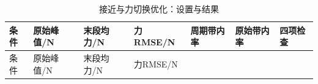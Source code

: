 \FloatBarrier\begingroup\small\setlength{\tabcolsep}{2.5pt}
\begin{longtable}[]{@{}
  >{\raggedright\arraybackslash}p{}
  >{\raggedright\arraybackslash}p{}
  >{\raggedright\arraybackslash}p{}
  >{\raggedright\arraybackslash}p{}
  >{\raggedright\arraybackslash}p{}
  >{\raggedright\arraybackslash}p{}
  >{\raggedright\arraybackslash}p{}@{}}
\caption{接近与力切换优化：设置与结果}\label{tab:s14-1}\tabularnewline
\toprule\noalign{}
\begin{minipage}[b]{\linewidth}\raggedright
条件
\end{minipage} & \begin{minipage}[b]{\linewidth}\raggedright
原始峰值/N
\end{minipage} & \begin{minipage}[b]{\linewidth}\raggedright
末段均力/N
\end{minipage} & \begin{minipage}[b]{\linewidth}\raggedright
力RMSE/N
\end{minipage} & \begin{minipage}[b]{\linewidth}\raggedright
周期带内率
\end{minipage} & \begin{minipage}[b]{\linewidth}\raggedright
原始带内率
\end{minipage} & \begin{minipage}[b]{\linewidth}\raggedright
四项检查
\end{minipage} \\
\midrule\noalign{}
\endfirsthead
\toprule\noalign{}
\begin{minipage}[b]{\linewidth}\raggedright
条件
\end{minipage} & \begin{minipage}[b]{\linewidth}\raggedright
原始峰值/N
\end{minipage} & \begin{minipage}[b]{\linewidth}\raggedright
末段均力/N
\end{minipage} & \begin{minipage}[b]{\linewidth}\raggedright
力RMSE/N
\end{minipage} & \begin{minipage}[b]{\linewidth}\raggedright

\end{minipage}
\end{longtable}
